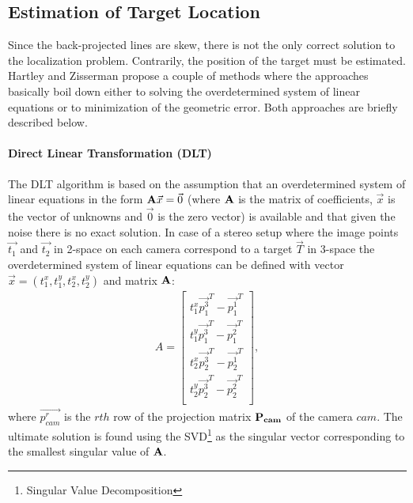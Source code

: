 \subsection{Estimation of Target Location} \label{txt:estimation_of_target_location}

Since the back-projected lines are skew, there is not the only correct solution to the localization problem. Contrarily, the position of the target must be estimated. Hartley and Zisserman \cite{Hartley:2003:MVG:861369} propose a couple of methods where the approaches basically boil down either to solving the overdetermined system of linear equations or to minimization of the geometric error. Both approaches are briefly described below.

\paragraph{Direct Linear Transformation (DLT)} The DLT algorithm is based on the assumption that an overdetermined system of linear equations in the form $\mathbf{A}\vec{x} = \vec{0}$ (where $\mathbf{A}$ is the matrix of coefficients, $\vec{x}$ is the vector of unknowns and $\vec{0}$ is the zero vector) is available and that given the noise there is no exact solution. In case of a stereo setup where the image points $\vec{t_{1}}$ and $\vec{t_{2}}$ in 2-space on each camera correspond to a target $\vec{T}$ in 3-space the overdetermined system of linear equations can be defined with vector $\vec{x} = (t_{1}^{x}, t_{1}^{y}, t_{2}^{x}, t_{2}^{y})$ and matrix $\mathbf{A}$:
\begin{align}
	A = \begin{bmatrix}
		t_{1}^{x}\vec{p_{1}^{3}}^{T} - \vec{p_{1}^{1}}^{T} \\
		t_{1}^{y}\vec{p_{1}^{3}}^{T} - \vec{p_{1}^{2}}^{T} \\
		t_{2}^{x}\vec{p_{2}^{3}}^{T} - \vec{p_{2}^{1}}^{T} \\
		t_{2}^{y}\vec{p_{2}^{3}}^{T} - \vec{p_{2}^{2}}^{T} \\
	\end{bmatrix},
\end{align}
where $\vec{p_{cam}^{r}}$ is the $rth$ row of the projection matrix $\mathbf{P_{cam}}$ of the camera $cam$. The ultimate solution is found using the SVD\footnote{Singular Value Decomposition} as the singular vector corresponding to the smallest singular value of $\mathbf{A}$.

